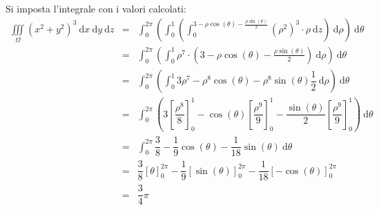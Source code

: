 \documentclass[a4paper]{article}
\begin{document}
	\noindent
	Si imposta l'integrale con i valori calcolati:
	\begin{equation*}
		\begin{array}{rcl}
			\displaystyle\iiint\limits_{\Omega} \left(x^{2}+y^{2}\right)^{3} \:\mathrm{d}x\:\mathrm{d}y\:\mathrm{d}z
			&=&
			\displaystyle\int_{0}^{2\pi} \left(
				\int_{0}^{1} \left(
					\int_{0}^{3-\rho\cos\left(\theta\right)-\frac{\rho\sin\left(\theta\right)}{2}} \left(\rho^{2}\right)^{3} \cdot \rho \:\mathrm{d}z 
				\right) \:\mathrm{d}\rho 
			\right) \:\mathrm{d}\theta \\ [1.5em]
			&=&
			\displaystyle\int_{0}^{2\pi} \left(
				\int_{0}^{1} \rho^{7} \cdot \left(3-\rho\cos\left(\theta\right)-\frac{\rho\sin\left(\theta\right)}{2}\right) \:\mathrm{d}\rho 
			\right) \:\mathrm{d}\theta \\ [1.5em]
			&=&
			\displaystyle\int_{0}^{2\pi} \left(
				\int_{0}^{1} 3\rho^{7} - \rho^{8}\cos\left(\theta\right)-\rho^{8}\sin\left(\theta\right)\dfrac{1}{2} \:\mathrm{d}\rho 
			\right) \:\mathrm{d}\theta \\ [1.5em]
			&=&
			\displaystyle\int_{0}^{2\pi} \left(
				3\left[\dfrac{\rho^{8}}{8}\right]_{0}^{1} - \cos\left(\theta\right)\left[\dfrac{\rho^{9}}{9}\right]_{0}^{1} - \dfrac{\sin\left(\theta\right)}{2}\left[\dfrac{\rho^{9}}{9}\right]_{0}^{1}
			\right) \:\mathrm{d}\theta \\ [1.5em]
			&=&
			\displaystyle\int_{0}^{2\pi} \dfrac{3}{8} - \dfrac{1}{9}\cos\left(\theta\right) - \dfrac{1}{18}\sin\left(\theta\right) \:\mathrm{d}\theta \\ [1.5em]
			&=&
			\dfrac{3}{8}\left[\theta\right]_{0}^{2\pi} - \dfrac{1}{9}\left[\sin\left(\theta\right)\right]_{0}^{2\pi} - \dfrac{1}{18}\left[-\cos\left(\theta\right)\right]_{0}^{2\pi} \\ [1.5em]
			&=&
			\dfrac{3}{4}\pi
		\end{array}
	\end{equation*}

	\newpage
\end{document}
